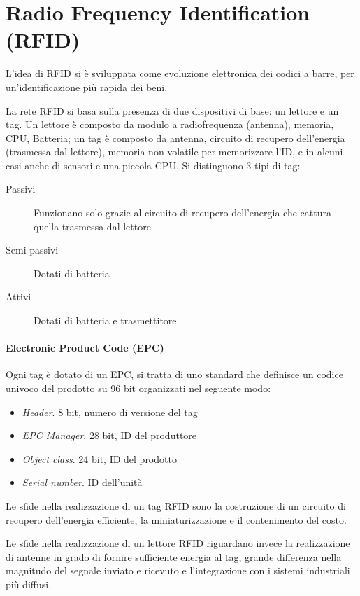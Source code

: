 \section{Radio Frequency Identification (RFID)}

	L'idea di RFID si è sviluppata come evoluzione elettronica dei codici a barre, per un'identificazione più rapida dei beni.
	
	La rete RFID si basa sulla presenza di due dispositivi di base: un lettore e un tag.
	Un lettore è composto da modulo a radiofrequenza (antenna), memoria, CPU, Batteria;
	un tag è composto da antenna, circuito di recupero dell'energia (trasmessa dal lettore), memoria non volatile per memorizzare l'ID, e in alcuni casi anche di sensori e una piccola CPU.
	Si distinguono 3 tipi di tag:
	\begin{description}
		\item[Passivi] Funzionano solo grazie al circuito di recupero dell'energia che cattura quella trasmessa dal lettore
		\item[Semi-passivi]  Dotati di batteria
		\item[Attivi] Dotati di batteria e trasmettitore
	\end{description}

	\paragraph{Electronic Product Code (EPC)}
	Ogni tag è dotato di un EPC, si tratta di uno standard che definisce un codice univoco del prodotto su 96 bit organizzati nel seguente modo:
	\begin{itemize}
		\item \textit{Header}. 8 bit, numero di versione del tag
		\item \textit{EPC Manager}. 28 bit, ID del produttore
		\item \textit{Object class}. 24 bit, ID del prodotto
		\item \textit{Serial number}. ID dell'unità
	\end{itemize}

	Le sfide nella realizzazione di un tag RFID sono la costruzione di un circuito di recupero dell'energia efficiente, la miniaturizzazione e il contenimento del costo.
	
	Le sfide nella realizzazione di un lettore RFID riguardano invece la realizzazione di antenne in grado di fornire sufficiente energia al tag, grande differenza nella magnitudo del segnale inviato e ricevuto e l'integrazione con i sistemi industriali più diffusi.
	
